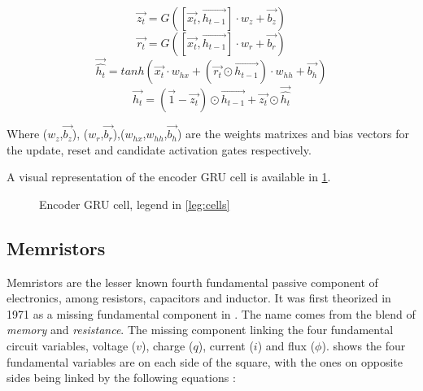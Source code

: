 \begin{equation}\label{eq:updateG}
  \overrightarrow{z_t}= G ([\overrightarrow{x_t},\overrightarrow{h_{t-1}}] \cdot w_z + \overrightarrow{b_z})
\end{equation}
\begin{equation}\label{eq:resetG}
  \overrightarrow{r_t}= G ([\overrightarrow{x_t},\overrightarrow{h_{t-1}}] \cdot w_r + \overrightarrow{b_r})
\end{equation}
\begin{equation}\label{eq:candActivG}
  \overrightarrow{\hat{h_t}}=tanh(\overrightarrow{x_t}\cdot w_{hx}+(\overrightarrow{r_t}\odot\overrightarrow{h_{t-1}}) \cdot w_{hh} + \overrightarrow{b_h})
\end{equation}
\begin{equation}\label{eq:gruHidG}
  \overrightarrow{h_t}=(\overrightarrow{1}-\overrightarrow{z_t})\odot \overrightarrow{h_{t-1}} + \overrightarrow{z_t}\odot \overrightarrow{\hat{h_t}}
\end{equation}

Where ($w_z$,$\overrightarrow{b_z}$), ($w_r$,$\overrightarrow{b_r}$),($w_{hx}$,$w_{hh}$,$\overrightarrow{b_h}$) are the weights matrixes and bias vectors for the update, reset and candidate activation gates respectively.

A visual representation of the encoder \ac{GRU} cell is available in \cref{fig:encoderGruCell}.

\begin{figure}[t]
  \centering
  
  \caption{Encoder \acs{GRU} cell, legend in \cref{leg:cells}\label{fig:encoderGruCell}}
\end{figure}

\subsection{Memristors}

Memristors are the lesser known fourth fundamental passive component of electronics, among resistors, capacitors and inductor.
It was first theorized in 1971 as a missing fundamental component in \cite{TheoMemristor}. The name comes from the blend of \textit{memory} and \textit{resistance}.
The missing component linking the four fundamental circuit variables, voltage ($v$), charge ($q$), current ($i$) and flux ($\phi$).  shows the four fundamental variables are on each side of the square, with the ones on opposite sides being linked by the following equations :

